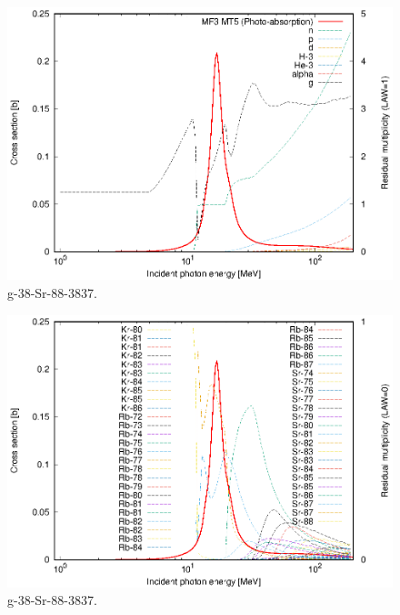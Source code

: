 \begin{figure}
 \includegraphics[width=\linewidth]{eps/g_38-Sr-88_3837.eps}
  \caption{g-38-Sr-88-3837.}
\end{figure}
\begin{figure}
 \includegraphics[width=\linewidth]{eps-law0/g_38-Sr-88_3837.eps}
 \caption{g-38-Sr-88-3837.}
\end{figure}
\newpage \clearpage

